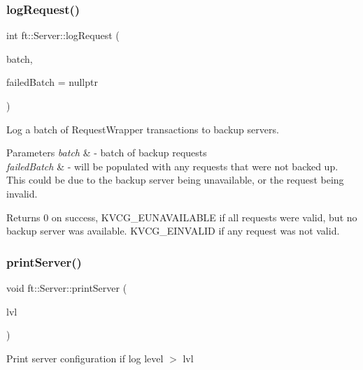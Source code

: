 \subsubsection{\texorpdfstring{log\+Request()}{logRequest()}\hspace{0.1cm}{\footnotesize\ttfamily [3/3]}}
{\footnotesize\ttfamily int ft\+::\+Server\+::log\+Request (\begin{DoxyParamCaption}\item[{std\+::vector$<$ Request\+Wrapper$<$ unsigned long long, data\+\_\+t $\ast$$>$$>$}]{batch,  }\item[{std\+::vector$<$ Request\+Wrapper$<$ unsigned long long, data\+\_\+t $\ast$$>$$>$ $\ast$}]{failed\+Batch = {\ttfamily nullptr} }\end{DoxyParamCaption})}

Log a batch of Request\+Wrapper transactions to backup servers.


\begin{DoxyParams}{Parameters}
{\em batch} & -\/ batch of backup requests \\
\hline
{\em failed\+Batch} & -\/ will be populated with any requests that were not backed up. This could be due to the backup server being unavailable, or the request being invalid.\\
\hline
\end{DoxyParams}
\begin{DoxyReturn}{Returns}
0 on success, K\+V\+C\+G\+\_\+\+E\+U\+N\+A\+V\+A\+I\+L\+A\+B\+LE if all requests were valid, but no backup server was available. K\+V\+C\+G\+\_\+\+E\+I\+N\+V\+A\+L\+ID if any request was not valid. 
\end{DoxyReturn}
\mbox{\label{classft_1_1Server_a0c333cc78d88ff7ada32ffff429a8788}} 
\subsubsection{\texorpdfstring{print\+Server()}{printServer()}}
{\footnotesize\ttfamily void ft\+::\+Server\+::print\+Server (\begin{DoxyParamCaption}\item[{const Log\+Level}]{lvl }\end{DoxyParamCaption})}

Print server configuration if log level $>$ lvl


